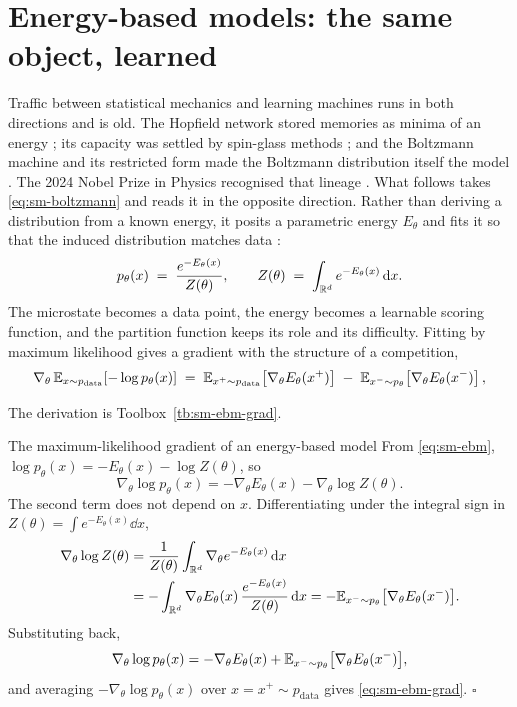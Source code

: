 \section{Energy-based models: the same object, learned}
\label{sec:sm-ebm}

Traffic between statistical mechanics and learning machines runs in both
directions and is old. The Hopfield network stored memories as minima of an
energy \citep{hopfield1982neural}; its capacity was settled by spin-glass methods
\citep{amit1985storing, mezard1987spin, gardner1988space}; and the Boltzmann
machine and its restricted form made the Boltzmann distribution itself the model
\citep{ackley1985learning, smolensky1986information}. The 2024 Nobel Prize in
Physics recognised that lineage \citep{nobel2024physics}. What follows takes
\eqref{eq:sm-boltzmann} and reads it in the opposite direction. Rather than deriving a distribution from a known energy, it
posits a parametric energy $E_\theta$ and fits it so that the induced
distribution matches data \citep{ackley1985learning, lecun2006tutorial}:
\begin{equation}
  p_\theta(x) \;=\; \frac{e^{-E_\theta(x)}}{Z(\theta)},
  \qquad
  Z(\theta) \;=\; \int_{\mathbb{R}^{d}} e^{-E_\theta(x)}\, \mathrm{d} x .
  \label{eq:sm-ebm}
\end{equation}
The microstate becomes a data point, the energy becomes a learnable scoring
function, and the partition function keeps its role and its difficulty. Fitting
by maximum likelihood gives a gradient with the structure of a competition,
\begin{equation}
  \nabla_\theta\, \mathbb{E}_{x \sim p_{\mathrm{data}}}\!\left[-\log p_\theta(x)\right]
  \;=\;
  \mathbb{E}_{x^{+} \sim p_{\mathrm{data}}}\!\left[\nabla_\theta E_\theta(x^{+})\right]
  \;-\;
  \mathbb{E}_{x^{-} \sim p_{\theta}}\!\left[\nabla_\theta E_\theta(x^{-})\right],
  \label{eq:sm-ebm-grad}
\end{equation}

\noindent The derivation is Toolbox~\ref{tb:sm-ebm-grad}.

\begin{toolbox}{The maximum-likelihood gradient of an energy-based model}
From \eqref{eq:sm-ebm}, $\log p_\theta(x) = -E_\theta(x) - \log Z(\theta)$, so
\[
  \nabla_\theta \log p_\theta(x)
  = -\nabla_\theta E_\theta(x) - \nabla_\theta \log Z(\theta).
\]
The second term does not depend on $x$. Differentiating under the integral
sign in $Z(\theta) = \int e^{-E_\theta(x)}\dd x$,
\[
\begin{aligned}
  \nabla_\theta \log Z(\theta)
  &= \frac{1}{Z(\theta)}
     \int_{\mathbb{R}^d} \nabla_\theta e^{-E_\theta(x)}\,\mathrm{d} x \\
  &= -\int_{\mathbb{R}^d} \nabla_\theta E_\theta(x)\,
     \frac{e^{-E_\theta(x)}}{Z(\theta)}\,\mathrm{d} x
   = -\mathbb{E}_{x^- \sim p_\theta}
     \big[\nabla_\theta E_\theta(x^-)\big].
\end{aligned}
\]
Substituting back,
\[
  \nabla_\theta \log p_\theta(x) = -\nabla_\theta E_\theta(x)
  + \mathbb{E}_{x^- \sim p_\theta}\big[\nabla_\theta E_\theta(x^-)\big],
\]
and averaging $-\nabla_\theta \log p_\theta(x)$ over $x = x^+ \sim p_{\mathrm{data}}$
gives \eqref{eq:sm-ebm-grad}. \hfill$\square$
\end{toolbox}

